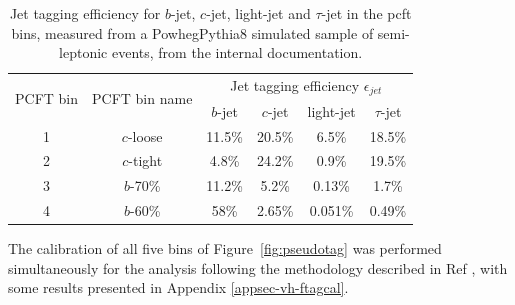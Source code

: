 \begin{itemize}
\begin{table}[h!]
\begin{center}
        \begin{tabular}{c|c|cccc}
          \hline \hline
          \multirow{2}{*}{PCFT bin} & \multirow{2}{*}{PCFT bin name} & \multicolumn{4}{c}{Jet tagging efficiency $\epsilon_{jet}$}\\
          & & $b$-jet &  $c$-jet &  light-jet & $\tau$-jet \\ 
          \hline
          1 & $c$-loose & 11.5\% & 20.5\% & 6.5\%   & 18.5\%\\
          2 & $c$-tight & 4.8\%  & 24.2\% & 0.9\%   & 19.5\%\\
          3 & $b$-70\%  & 11.2\% &  5.2\% & 0.13\%  &  1.7\%\\
          4 & $b$-60\%  & 58\%   & 2.65\% & 0.051\% & 0.49\%\\
          \hline \hline
        \end{tabular}
      \caption{Jet tagging efficiency for $b$-jet, $c$-jet, light-jet and $\tau$-jet in the \gls{pcft} bins, measured from a PowhegPythia8 simulated sample of semi-leptonic \ttb events, from the internal documentation.}
     \label{tbl:PCFTtageff}
    \end{center}
  \end{table}

  The calibration of all five bins of Figure~\ref{fig:pseudotag} was performed simultaneously for the analysis following the methodology described in Ref \cite{atlas:FTAGRUN2}, with some results presented in Appendix \ref{appsec-vh-ftagcal}.
  

\end{itemize}
